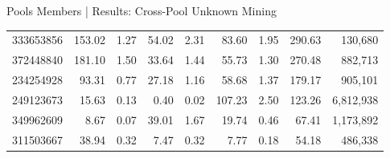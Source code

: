 \documentclass[10pt]{beamer}
\begin{document}
\begin{frame}[fragile]{Pools Members | Results: Cross-Pool Unknown Mining}
\begin{table}[]
{\begin{tabular}{@{}rrrrrrrrr@{}}
            333653856  & 153.02                  & 1.27                      & 54.02                   & 2.31                      & 83.60                   & 1.95                      & 290.63               & 130,680   \\
            372448840  & 181.10                  & 1.50                      & 33.64                   & 1.44                      & 55.73                   & 1.30                      & 270.48               & 882,713  \\
            234254928  & 93.31                   & 0.77                      & 27.18                   & 1.16                      & 58.68                   & 1.37                      & 179.17               & 905,101   \\
            249123673  & 15.63                   & 0.13                      & 0.40                    & 0.02                      & 107.23                  & 2.50                      & 123.26               & 6,812,938 \\
            349962609  & 8.67                    & 0.07                      & 39.01                   & 1.67                      & 19.74                   & 0.46                      & 67.41                & 1,173,892 \\
            311503667  & 38.94                   & 0.32                      & 7.47                    & 0.32                      & 7.77                    & 0.18                      & 54.18                & 486,338 \\
            \bottomrule
            \end{tabular}
        }
    \end{table}
\end{frame}
\end{document}
